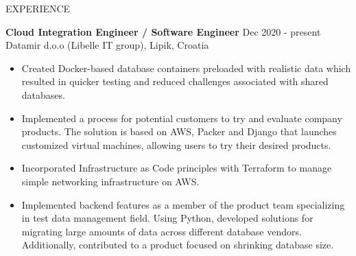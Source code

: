 \documentclass{resume} %
\begin{document}
\begin{rSection}{EXPERIENCE}

\textbf{Cloud Integration Engineer / Software Engineer} \hfill Dec 2020 - present\\
Datamir d.o.o (Libelle IT group), Lipik, Croatia \hfill
 \begin{itemize}
    \itemsep -3pt {} 
     \item Created Docker-based database containers preloaded with realistic data which resulted in quicker testing and reduced challenges associated with shared databases.
    \item Implemented a process for potential customers to try and evaluate company products. The solution is based on AWS, Packer and Django that launches customized virtual machines, allowing users to try their desired products.   
    \item Incorporated Infrastructure as Code principles with Terraform to manage simple networking infrastructure on AWS.
    \item Implemented backend features as a member of the product team specializing in test data management field. Using Python, developed solutions for migrating large amounts of data across different database vendors. Additionally, contributed to a product focused on shrinking database size.
 \end{itemize}
 
\end{rSection} 

\end{document}
